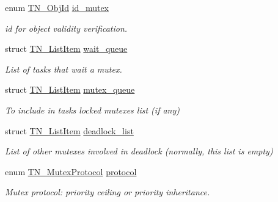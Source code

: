 \begin{DoxyCompactItemize}
\item 
enum \hyperlink{tn__common_8h_ae779dd1f6735f6e139fb70acd004d976}{T\+N\+\_\+\+Obj\+Id} \hyperlink{structTN__Mutex_a09b2fb7b45cab984dd3db1c9d1d3b5b4}{id\+\_\+mutex}
\begin{DoxyCompactList}\small\item\em id for object validity verification. \end{DoxyCompactList}\item 
\mbox{\label{structTN__Mutex_a65bc07cade239063ba47a140a7d46a92}} 
struct \hyperlink{structTN__ListItem}{T\+N\+\_\+\+List\+Item} \hyperlink{structTN__Mutex_a65bc07cade239063ba47a140a7d46a92}{wait\+\_\+queue}
\begin{DoxyCompactList}\small\item\em List of tasks that wait a mutex. \end{DoxyCompactList}\item 
\mbox{\label{structTN__Mutex_a3d9a36e9441d047a4ec04878cf4ca2fd}} 
struct \hyperlink{structTN__ListItem}{T\+N\+\_\+\+List\+Item} \hyperlink{structTN__Mutex_a3d9a36e9441d047a4ec04878cf4ca2fd}{mutex\+\_\+queue}
\begin{DoxyCompactList}\small\item\em To include in task\textquotesingle{}s locked mutexes list (if any) \end{DoxyCompactList}\item 
\mbox{\label{structTN__Mutex_afd61f3a49d4c2538a6784e2202893e47}} 
struct \hyperlink{structTN__ListItem}{T\+N\+\_\+\+List\+Item} \hyperlink{structTN__Mutex_afd61f3a49d4c2538a6784e2202893e47}{deadlock\+\_\+list}
\begin{DoxyCompactList}\small\item\em List of other mutexes involved in deadlock (normally, this list is empty) \end{DoxyCompactList}\item 
\mbox{\label{structTN__Mutex_a94cb6bc95a05bfd95c0a088c56712bab}} 
enum \hyperlink{tn__mutex_8h_a11357f7bb31a3b380cbe94e0913a5b40}{T\+N\+\_\+\+Mutex\+Protocol} \hyperlink{structTN__Mutex_a94cb6bc95a05bfd95c0a088c56712bab}{protocol}
\begin{DoxyCompactList}\small\item\em Mutex protocol\+: priority ceiling or priority inheritance. \end{DoxyCompactList}\item 

\end{DoxyCompactItemize}

